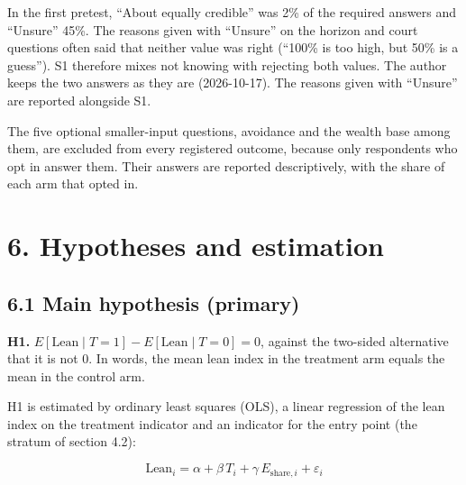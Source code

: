 In the first pretest, ``About equally credible'' was 2\% of the required answers and ``Unsure'' 45\%.
The reasons given with ``Unsure'' on the horizon and court questions often said that neither value
was right (``100\% is too high, but 50\% is a guess''). S1 therefore mixes not knowing with rejecting
both values. The author keeps the two answers as they are (2026-10-17). The reasons given with
``Unsure'' are reported alongside S1.

The five optional smaller-input questions, avoidance and the wealth base among them, are excluded from every
registered outcome, because only respondents who opt in answer them. Their answers are reported
descriptively, with the share of each arm that opted in.

\section{6. Hypotheses and estimation}\label{hypotheses-and-estimation}

\subsection{6.1 Main hypothesis (primary)}\label{main-hypothesis-primary}

\textbf{H1.} \(E[\mathrm{Lean} \mid T = 1] - E[\mathrm{Lean} \mid T = 0] = 0\), against the two-sided alternative that it is not 0.
In words, the mean lean index in the treatment arm equals the mean in the control arm.

H1 is estimated by ordinary least squares (OLS), a linear regression of the lean index on the
treatment indicator and an indicator for the entry point (the stratum of section 4.2):

\[\mathrm{Lean}_i = \alpha + \beta\, T_i + \gamma\, E_{\mathrm{share},i} + \varepsilon_i\]

